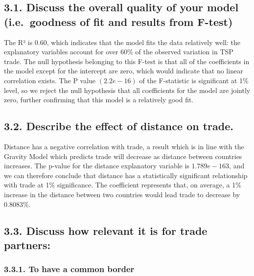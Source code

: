 \documentclass[
]{article}
\begin{document}
\hypertarget{discuss-the-overall-quality-of-your-model-i.e.-goodness-of-fit-and-results-from-f-test}{%
\subsection{3.1. Discuss the overall quality of your model
(i.e.~goodness of fit and results from
F-test)}\label{discuss-the-overall-quality-of-your-model-i.e.-goodness-of-fit-and-results-from-f-test}}

The R² is 0.60, which indicates that the model fits the data relatively
well: the explanatory variables account for over 60\% of the observed
variation in TSP trade. The null hypothesis belonging to this F-test is
that all of the coefficients in the model except for the intercept are
zero, which would indicate that no linear correlation exists. The P
value \((2.2e-16)\) of the F-statistic is significant at 1\% level, so
we reject the null hypothesis that all coefficients for the model are
jointly zero, further confirming that this model is a relatively good
fit.

\hypertarget{describe-the-effect-of-distance-on-trade.}{%
\subsection{3.2. Describe the effect of distance on
trade.}\label{describe-the-effect-of-distance-on-trade.}}

Distance has a negative correlation with trade, a result which is in
line with the Gravity Model which predicts trade will decrease as
distance between countries increases. The p-value for the distance
explanatory variable is \(1.789e-163\), and we can therefore conclude
that distance has a statistically significant relationship with trade at
1\% significance. The coefficient represents that, on average, a 1\%
increase in the distance between two countries would lead trade to
decrease by 0.8083\%.

\hypertarget{discuss-how-relevant-it-is-for-trade-partners}{%
\subsection{3.3. Discuss how relevant it is for trade
partners:}\label{discuss-how-relevant-it-is-for-trade-partners}}

\hypertarget{to-have-a-common-border}{%
\subsubsection{3.3.1. To have a common
border}\label{to-have-a-common-border}}
\end{document}
